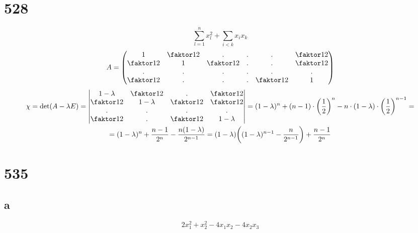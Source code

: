 \section{528}

$$ \sum_{l = 1}^n x_l^2 + \sum_{i < k} x_ix_k $$
$$ A =
\begin{pmatrix}
	1 & \faktor12 & . & . & . & \faktor12 \\
    \faktor12 & 1 & \faktor12 & . & . & \faktor12 \\
    . & . & . & . & . & . \\
    \faktor12 & . & . & . & \faktor12 & 1
\end{pmatrix} $$
\begin{multline*}
    \chi = \det(A - \lambda E) =
    \begin{vmatrix}
        1 - \lambda & \faktor12 & . & \faktor12 \\
        \faktor12 & 1 - \lambda & \faktor12 & \faktor12 \\
        . & . & . & . \\
        \faktor12 & . & \faktor12 & 1 - \lambda
    \end{vmatrix} = (1 - \lambda)^n + (n - 1) \cdot \bigg( \half \bigg)^n - n \cdot (1 - \lambda) \cdot \bigg( \half \bigg)^{n - 1} = \\
    = (1 - \lambda)^n + \frac{n - 1}{2^n} - \frac{n(1 - \lambda)}{2^{n - 1}} = (1 - \lambda) \bigg( (1 - \lambda)^{n - 1} - \frac{n}{2^{n - 1}} \bigg) + \frac{n - 1}{2^n}
\end{multline*}

\section{535}

\subsection{a}

$$ 2x_1^2 + x_2^2 - 4x_1x_2 - 4x_2x_3 $$

